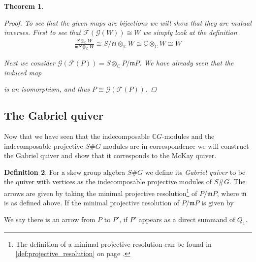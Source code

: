 \documentclass[11pt, a4paper, english]{article}
\newtheorem{theorem}{Theorem}[section]
\theoremstyle{definition}
\newtheorem{defin}[theorem]{Definition}
\newcommand{\C}{\mathbb{C}}
\begin{document}
\begin{theorem}
\begin{proof}
To see that the given maps are bijections we will show that they are mutual inverses. First to see that $\mathcal{F}(\mathcal{G}(W)) \cong W$ we simply look at the definition
\begin{equation*}
\begin{split}
\frac{S \otimes_\C W}{\mathfrak{m}S \otimes_\C W} \cong S/\mathfrak{m} \otimes_\C W \cong \C \otimes_\C W \cong W
\end{split}
\end{equation*}

Next we consider $\mathcal{G}(\mathcal{F}(P)) = S \otimes_\C P/\mathfrak{m}P$. We have already seen that the induced map
\begin{center}
\end{center}
is an isomorphism, and thus $P \cong \mathcal{G}(\mathcal{F}(P))$.
\end{proof}

\end{theorem}

\subsection{The Gabriel quiver}
Now that we have seen that the indecomposable $\C G$-modules and the indecomposable projective $S\#G$-modules are in correspondence we will construct the Gabriel quiver and show that it corresponds to the McKay quiver.

\begin{defin}
\label{def:gabriel_quiver}
For a skew group algebra $S\#G$ we define its \textit{Gabriel quiver} to be the quiver with vertices as the indecomposable projective modules of $S\#G$. The arrows are given by taking the minimal projective resolution\footnote{The definition of a minimal projective resolution can be found in \cref{def:projective_resolution} on page \pageref{def:projective_resolution}.} of $P/\mathfrak{m}P$, where $\mathfrak{m}$ is as defined above. If the minimal projective resolution of $P/\mathfrak{m}P$ is given by
\begin{center}
\end{center}
We say there is an arrow from $P$ to $P'$, if $P'$ appears as a direct summand of $Q_1$.
\end{defin}
\end{document}
